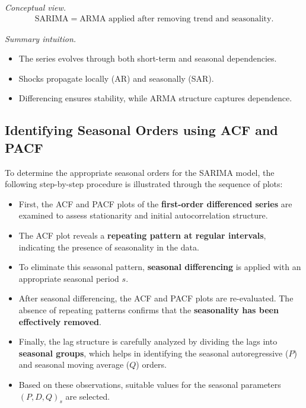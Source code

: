 \documentclass[10pt,a4paper]{article}
\begin{document}
	\textit{Conceptual view.}
	\begin{align*}
	\text{SARIMA} = \text{ARMA applied after removing trend and seasonality}.
	\end{align*}
	
	\textit{Summary intuition.}
	\begin{itemize}
	\item The series evolves through both short-term and seasonal dependencies.
	\item Shocks propagate locally (AR) and seasonally (SAR).
	\item Differencing ensures stability, while ARMA structure captures dependence.
	\end{itemize}
	
	
	
	\subsection{Identifying Seasonal Orders using ACF and PACF}
	
	To determine the appropriate seasonal orders for the SARIMA model, the following step-by-step procedure is illustrated through the sequence of plots:
	
	\begin{itemize}
	\item First, the ACF and PACF plots of the \textbf{first-order differenced series} are examined to assess stationarity and initial autocorrelation structure.
	
	\item The ACF plot reveals a \textbf{repeating pattern at regular intervals}, indicating the presence of seasonality in the data.
	
	\item To eliminate this seasonal pattern, \textbf{seasonal differencing} is applied with an appropriate seasonal period $s$.
	
	\item After seasonal differencing, the ACF and PACF plots are re-evaluated. The absence of repeating patterns confirms that the \textbf{seasonality has been effectively removed}.
	
	\item Finally, the lag structure is carefully analyzed by dividing the lags into \textbf{seasonal groups}, which helps in identifying the seasonal autoregressive ($P$) and seasonal moving average ($Q$) orders.
	
	\item Based on these observations, suitable values for the seasonal parameters $(P, D, Q)_s$ are selected.
	\end{itemize}
	
\end{document}

